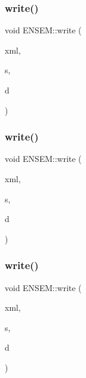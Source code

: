 \mbox{\label{namespaceENSEM_a5d6d46f2975052a57ae6d284798b574a}} 
\subsubsection{\texorpdfstring{write()}{write()}\hspace{0.1cm}{\footnotesize\ttfamily [2/13]}}
{\footnotesize\ttfamily void E\+N\+S\+E\+M\+::write (\begin{DoxyParamCaption}\item[{\mbox{\hyperlink{classADATXML_1_1XMLWriter}{A\+D\+A\+T\+X\+M\+L\+::\+X\+M\+L\+Writer}} \&}]{xml,  }\item[{const std\+::string \&}]{s,  }\item[{const \mbox{\hyperlink{classXMLArray_1_1Array}{Array}}$<$ \mbox{\hyperlink{group__defs_gab601f1c55eb75baed0a0859b3fec6bc1}{Real32}} $>$ \&}]{d }\end{DoxyParamCaption})}

\mbox{\label{namespaceENSEM_a3723b1ab200b48b7d24a4beee45aceef}} 
\subsubsection{\texorpdfstring{write()}{write()}\hspace{0.1cm}{\footnotesize\ttfamily [3/13]}}
{\footnotesize\ttfamily void E\+N\+S\+E\+M\+::write (\begin{DoxyParamCaption}\item[{\mbox{\hyperlink{classADATXML_1_1XMLWriter}{A\+D\+A\+T\+X\+M\+L\+::\+X\+M\+L\+Writer}} \&}]{xml,  }\item[{const std\+::string \&}]{s,  }\item[{const \mbox{\hyperlink{classXMLArray_1_1Array}{Array}}$<$ \mbox{\hyperlink{group__defs_gaae0bff35c031375b1ffeb693402496c8}{Real64}} $>$ \&}]{d }\end{DoxyParamCaption})}

\mbox{\label{namespaceENSEM_ac8d30a87c5709126729f9c0169804c2a}} 
\subsubsection{\texorpdfstring{write()}{write()}\hspace{0.1cm}{\footnotesize\ttfamily [4/13]}}
{\footnotesize\ttfamily void E\+N\+S\+E\+M\+::write (\begin{DoxyParamCaption}\item[{\mbox{\hyperlink{classADATXML_1_1XMLWriter}{A\+D\+A\+T\+X\+M\+L\+::\+X\+M\+L\+Writer}} \&}]{xml,  }\item[{const std\+::string \&}]{s,  }\item[{const \mbox{\hyperlink{classXMLArray_1_1Array}{Array}}$<$ \mbox{\hyperlink{group__defs_ga38f0cd64d26e121e75367986f2d7cd6c}{Boolean}} $>$ \&}]{d }\end{DoxyParamCaption})}

